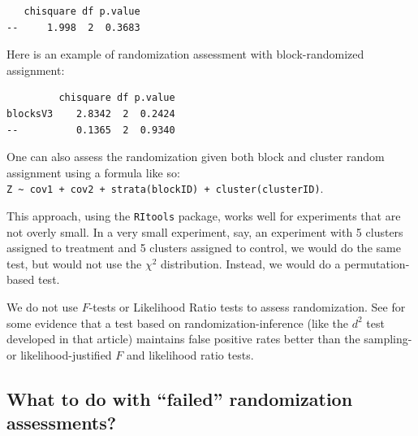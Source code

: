 \documentclass[
  12pt,
]{book}
\newenvironment{Shaded}{\begin{snugshade}}{\end{snugshade}}
\newcommand{\DataTypeTok}[1]{\textcolor[rgb]{0.13,0.29,0.53}{#1}}
\newcommand{\KeywordTok}[1]{\textcolor[rgb]{0.13,0.29,0.53}{\textbf{#1}}}
\newcommand{\NormalTok}[1]{#1}
\newcommand{\OperatorTok}[1]{\textcolor[rgb]{0.81,0.36,0.00}{\textbf{#1}}}
\newcommand{\StringTok}[1]{\textcolor[rgb]{0.31,0.60,0.02}{#1}}
\theoremstyle{definition}
\theoremstyle{definition}
\theoremstyle{definition}
\theoremstyle{remark}
\begin{document}
\begin{verbatim}
   chisquare df p.value
--     1.998  2  0.3683
\end{verbatim}

Here is an example of randomization assessment with block-randomized
assignment:

\begin{Shaded}
\end{Shaded}

\begin{verbatim}
         chisquare df p.value
blocksV3    2.8342  2  0.2424
--          0.1365  2  0.9340
\end{verbatim}

One can also assess the randomization given both block and cluster
random assignment using a formula like so:
\texttt{Z\ \textasciitilde{}\ cov1\ +\ cov2\ +\ strata(blockID)\ +\ cluster(clusterID)}.

This approach, using the \texttt{RItools} package, works well for
experiments that are not overly small. In a very small experiment, say,
an experiment with 5 clusters assigned to treatment and 5 clusters
assigned to control, we would do the same test, but would not use the
\(\chi^2\) distribution. Instead, we would do a permutation-based test.

We do not use \(F\)-tests or Likelihood Ratio tests to assess
randomization. See \citet{hansen_covariate_2008} for some evidence that
a test based on randomization-inference (like the \(d^2\) test developed
in that article) maintains false positive rates better than the
sampling- or likelihood-justified \(F\) and likelihood ratio tests.

\hypertarget{what-to-do-with-failed-randomization-assessments}{%
\subsection{What to do with ``failed'' randomization
assessments?}\label{what-to-do-with-failed-randomization-assessments}}
\end{document}
